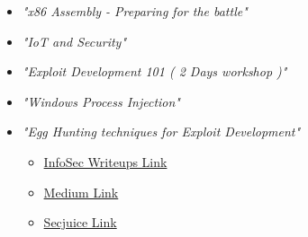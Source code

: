 \begin{itemize}

\item \textit{"x86 Assembly - Preparing for the battle"}
\item \textit{"IoT and Security"}
\item \textit{"Exploit Development 101 ( 2 Days workshop )"}
\item \textit{"Windows Process Injection"}
\item \textit{"Egg Hunting techniques for Exploit Development"}

\smallskip

\smallskip
\begin{itemize}
    \item \href{https://infosecwriteups.com/debuggers-nightmare-2bf6b6ffec05}{InfoSec Writeups Link}
\end{itemize}
\divider
\smallskip
\divider
\smallskip
{}
\begin{itemize}
    \item \href{https://malavvyas.medium.com/process-injection-5db481c43a46}{Medium Link}
\end{itemize}
\smallskip
\divider
\smallskip

\begin{itemize}
    \item \href{https://www.secjuice.com/guide-to-x86-assembly/}{Secjuice Link}
\end{itemize}
\divider
\clearpage
\end{itemize}
